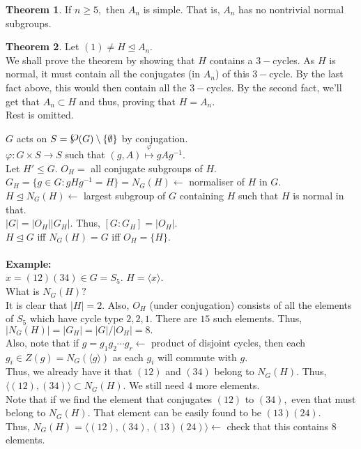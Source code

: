 \documentclass[12 pt, a4paper, toc=graduated, oneside]{article}
\theoremstyle{definition}
\newtheorem{theorem}{Theorem}
\newcommand{\pset}{\raisebox{.15\baselineskip}{{\Large\ensuremath{\wp}}}}
\begin{document}
\begin{theorem}
	If $n \ge 5,$ then $A_n$ is simple. That is, $A_n$ has no nontrivial normal subgroups.
\end{theorem}
\begin{theorem}
	Let $(1) \neq H \trianglelefteq A_n.$ \\
	We shall prove the theorem by showing that $H$ contains a $3-$cycles. As $H$ is normal, it must contain all the conjugates (in $A_n$) of this $3-$cycle. By the last fact above, this would then contain all the $3-$cycles. By the second fact, we'll get that $A_n \subset H$ and thus, proving that $H = A_n.$\\
	Rest is omitted.
\end{theorem}
$G$ acts on $ S = \pset (G) \setminus \{\emptyset\}$ by conjugation.\\
$\varphi : G\times S \to S$ such that $(g, A) \overset{\varphi}{\mapsto}gAg^{-1}.$\\
Let $H' \le G.$ $O_H = $ all conjugate subgroups of $H.$\\
$G_H = \{g \in G:gHg^{-1} = H\} = N_G(H)  \longleftarrow$ normaliser of $H$ in $G.$\\
$H \trianglelefteq N_G(H) \longleftarrow$ largest subgroup of $G$ containing $H$ such that $H$ is normal in that.\\
$|G| = |O_H||G_H|.$ Thus, $[G:G_H] = |O_H|.$\\
$H\trianglelefteq G$ iff $N_G(H) = G$ iff $O_H = \{H\}.$\\~\\
\textbf{Example:}\\
$x = (12)(34) \in G = S_5.$ $H = \langle x\rangle.$\\
What is $N_G(H)?$\\
It is clear that $|H| = 2.$ Also, $O_H$ (under conjugation) consists of all the elements of $S_5$ which have cycle type $2, 2, 1.$ There are $15$ such elements. Thus, $|N_G(H)| = |G_H| = |G|/|O_H| = 8.$\\
Also, note that if $g = g_1g_2\cdots g_r \longleftarrow$ product of disjoint cycles, then each $g_i \in Z(g) = N_G(\langle g\rangle)$ as each $g_i$ will commute with $g.$\\
Thus, we already have it that $(12)$ and $(34)$ belong to $N_G(H).$ Thus, $\langle (12), (34)\rangle \subset N_G(H).$ We still need $4$ more elements.\\
Note that if we find the element that conjugates $(12)$ to $(34),$ even that must belong to $N_G(H).$ That element can be easily found to be $(13)(24).$\\
Thus, $N_G(H) = \langle (12), (34), (13)(24)\rangle \longleftarrow$ check that this contains $8$ elements.
\end{document}
